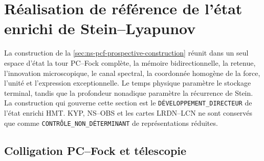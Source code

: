 \section{Réalisation de référence de l'état enrichi de Stein--Lyapunov}
\label{sec:ns-owner-closure}

La construction de la \cref{sec:ns-pcf-prospective-construction} réunit dans un seul espace d'état la tour PC--Fock complète, la mémoire bidirectionnelle, la retenue, l'innovation microscopique, le canal spectral, la coordonnée homogène de la force, l'unité et l'expression exceptionnelle. Le temps physique paramètre le stockage terminal, tandis que la profondeur nonadique paramètre la récurrence de Stein. La construction qui gouverne cette section est le \texttt{DÉVELOPPEMENT\_DIRECTEUR} de l'état enrichi HMT. KYP, NS--OBS et les cartes LRDN--LCN ne sont conservés que comme \texttt{CONTRÔLE\_NON\_DÉTERMINANT} de représentations réduites.

\subsection{Colligation PC--Fock et télescopie}

